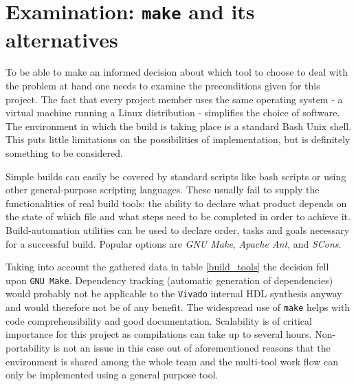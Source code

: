 
\chapter{Examination: \texttt{make} and its alternatives}

To be able to make an informed decision about which tool to choose to deal with the problem at hand one needs to examine the preconditions given for this project. The fact that every project member uses the same operating system - a virtual machine running a Linux distribution - simplifies the choice of software. The environment in which the build is taking place is a standard Bash Unix shell. This puts little limitations on the possibilities of implementation, but is definitely something to be considered.

Simple builds can easily be covered by standard scripts like bash scripts or using other general-purpose scripting languages. These usually fail to supply the functionalities of real build tools: the ability to declare what product depends on the state of which file and what steps need to be completed in order to achieve it. Build-automation utilities can be used to declare order, tasks and goals necessary for a successful build. Popular options are \textit{GNU Make}, \textit{Apache Ant}, and \textit{SCons}.

\begin{table}[h]
\centering
\begingroup
\setlength{\tabcolsep}{8pt} %
\renewcommand{\arraystretch}{2.5} %
\endgroup
\caption{Comparison of build automation tools based on  \cite{Hae08}, \cite{Spin08}, \cite{Serr04} and \cite{Make16}}
\label{build_tools}
\end{table}

\noindent
Taking into account the gathered data in table \ref{build_tools} the decision fell upon \texttt{GNU Make}. Dependency tracking (automatic generation of dependencies) would probably not be applicable to the \texttt{Vivado} internal \acs{HDL} synthesis anyway and would therefore not be of any benefit. The widespread use of \texttt{make} helps with code comprehensibility and good documentation. Scalability is of critical importance for this project as compilations can take up to several hours. Non-portability is not an issue in this case out of aforementioned reasons that the environment is shared among the whole team and the multi-tool work flow can only be implemented using a general purpose tool.

